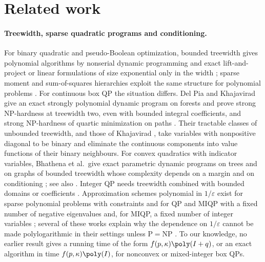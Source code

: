 \section{Related work}\label{sec:related}

\paragraph{Treewidth, sparse quadratic programs and conditioning.}
For binary quadratic and pseudo-Boolean optimization, bounded treewidth gives
polynomial algorithms by nonserial dynamic programming
\cite{BerteleBrioschi1972,CramaHansenJaumard1990,Dechter1999} and exact
lift-and-project or linear formulations of size exponential only in the width
\cite{BienstockOzbay2004,WainwrightJordan2004,Laurent2009}; sparse moment and
sum-of-squares hierarchies exploit the same structure for polynomial problems
\cite{WakiEtAl2006,Lasserre2006}. For continuous box QP the situation differs.
Del Pia and Khajavirad give an exact strongly polynomial dynamic program on
forests and prove strong NP-hardness at treewidth two, even with bounded
integral coefficients, and strong NP-hardness of quartic minimization on paths
\cite[Theorems~1--3]{DelPiaKhajavirad2026}. Their tractable classes of
unbounded treewidth, and those of Khajavirad \cite{Khajavirad2026PolyBox},
take variables with nonpositive diagonal to be binary and eliminate the
continuous components into value functions of their binary neighbours. For
convex quadratics with indicator variables, Bhathena et al.\ give exact
parametric dynamic programs on trees and on graphs of bounded treewidth whose
complexity depends on a margin and on conditioning
\cite{BhathenaEtAl2026Trees,BhathenaEtAl2026Graphs}; see also
\cite{BienstockChen2024}. Integer QP needs treewidth combined with bounded
domains or coefficients \cite{EibenEtAl2019,GanianOrdyniak2018,Lokshtanov2015}.
Approximation schemes polynomial in $1/\varepsilon$ exist for sparse polynomial
problems with constraints \cite[Theorem~4]{BienstockMunoz2018} and for QP
and MIQP with a fixed number of negative eigenvalues and, for MIQP, a fixed
number of integer variables \cite{Vavasis1992,DelPia2023,DelPia2026Jacobi};
several of these works explain why the dependence on $1/\varepsilon$ cannot be
made polylogarithmic in their settings unless P${}={}$NP
\cite{BienstockMunoz2018,Vavasis1992,DelPia2026Jacobi}. To our knowledge, no
earlier result gives a running time of the form $f(p,\kappa)\poly(I+q)$, or an
exact algorithm in time $f(p,\kappa)\poly(I)$, for nonconvex or mixed-integer
box QPs.

